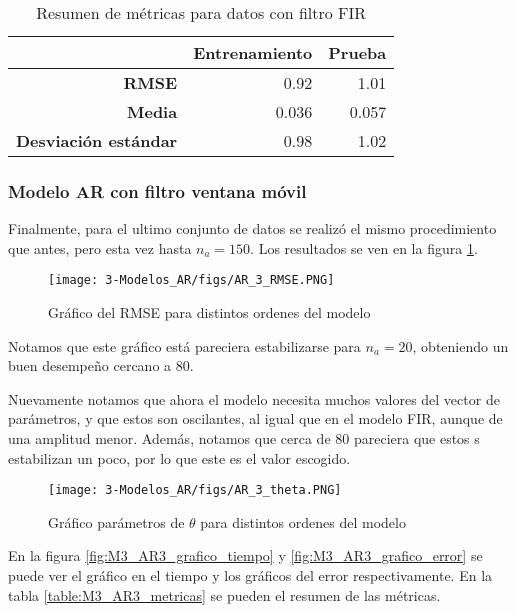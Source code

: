 \begin{table}[H]
	\centering
	\begin{tabular}{rr|r}
		\hline \hline
		&	Entrenamiento & Prueba \\
		\hline
		\textbf{RMSE}   				& 0.92 & 1.01 \\
		\textbf{Media}     				& 0.036  & 0.057  \\
		\textbf{Desviación estándar} 	& 0.98 & 1.02 \\ 
		\hline \hline
	\end{tabular}
	\caption{Resumen de métricas para datos con filtro FIR}
	\label{table:M3_AR2_metricas}
\end{table}







\subsubsection{Modelo AR con filtro ventana móvil}

Finalmente, para el ultimo conjunto de datos se realizó el mismo procedimiento que antes, pero esta vez hasta $n_a=150$. Los resultados se ven en la figura \ref{fig:M3_AR3_RMSE}.

\begin{figure}[H]
	\centering
	\texttt{[image: 3-Modelos\_AR/figs/AR\_3\_RMSE.PNG]}
	\caption{Gráfico del RMSE para distintos ordenes del modelo}
	\label{fig:M3_AR3_RMSE}
\end{figure}

Notamos que este gráfico está pareciera estabilizarse para $n_a=20$, obteniendo un buen desempeño cercano a 80.

Nuevamente notamos que ahora el modelo necesita muchos valores del vector de parámetros, y que estos son oscilantes, al igual que en el modelo FIR, aunque de una amplitud menor. Además, notamos que cerca de $80$ pareciera que estos s estabilizan un poco, por lo que este es el valor escogido.

\begin{figure}[H]
	\centering
	\texttt{[image: 3-Modelos\_AR/figs/AR\_3\_theta.PNG]}
	\caption{Gráfico parámetros de $\theta$ para distintos ordenes del modelo}
	\label{fig:M3_AR3_theta}
\end{figure}

En la figura \ref{fig:M3_AR3_grafico_tiempo} y \ref{fig:M3_AR3_grafico_error} se puede ver el gráfico en el tiempo y los gráficos del error respectivamente. En la tabla \ref{table:M3_AR3_metricas} se pueden el resumen de las métricas.


